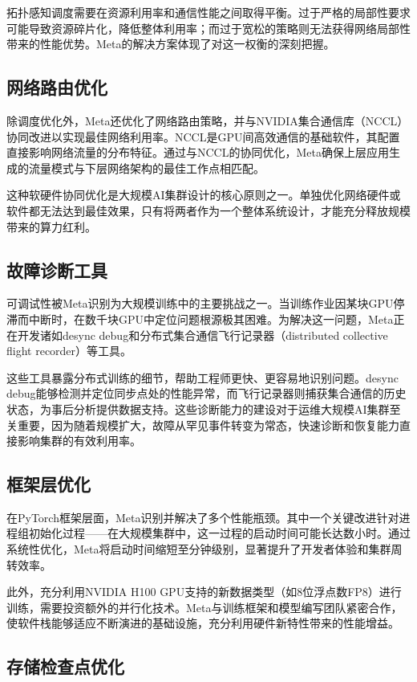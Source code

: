 拓扑感知调度需要在资源利用率和通信性能之间取得平衡。过于严格的局部性要求可能导致资源碎片化，降低整体利用率；而过于宽松的策略则无法获得网络局部性带来的性能优势。Meta的解决方案体现了对这一权衡的深刻把握。

\subsection{网络路由优化}

除调度优化外，Meta还优化了网络路由策略，并与NVIDIA集合通信库（NCCL）协同改进以实现最佳网络利用率。NCCL是GPU间高效通信的基础软件，其配置直接影响网络流量的分布特征。通过与NCCL的协同优化，Meta确保上层应用生成的流量模式与下层网络架构的最佳工作点相匹配。

这种软硬件协同优化是大规模AI集群设计的核心原则之一。单独优化网络硬件或软件都无法达到最佳效果，只有将两者作为一个整体系统设计，才能充分释放规模带来的算力红利。

\subsection{故障诊断工具}

可调试性被Meta识别为大规模训练中的主要挑战之一。当训练作业因某块GPU停滞而中断时，在数千块GPU中定位问题根源极其困难。为解决这一问题，Meta正在开发诸如desync debug和分布式集合通信飞行记录器（distributed collective flight recorder）等工具。

这些工具暴露分布式训练的细节，帮助工程师更快、更容易地识别问题。desync debug能够检测并定位同步点处的性能异常，而飞行记录器则捕获集合通信的历史状态，为事后分析提供数据支持。这些诊断能力的建设对于运维大规模AI集群至关重要，因为随着规模扩大，故障从罕见事件转变为常态，快速诊断和恢复能力直接影响集群的有效利用率。

\subsection{框架层优化}

在PyTorch框架层面，Meta识别并解决了多个性能瓶颈。其中一个关键改进针对进程组初始化过程——在大规模集群中，这一过程的启动时间可能长达数小时。通过系统性优化，Meta将启动时间缩短至分钟级别，显著提升了开发者体验和集群周转效率。

此外，充分利用NVIDIA H100 GPU支持的新数据类型（如8位浮点数FP8）进行训练，需要投资额外的并行化技术。Meta与训练框架和模型编写团队紧密合作，使软件栈能够适应不断演进的基础设施，充分利用硬件新特性带来的性能增益。

\subsection{存储检查点优化}

